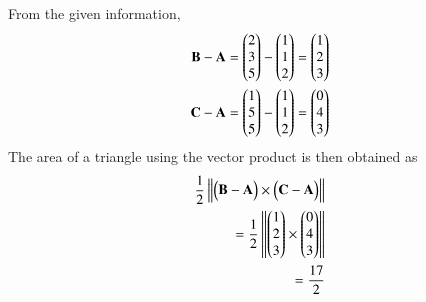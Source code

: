 From the given information, 
%
\begin{align}
\vec{B-A}&=\myvec{2\\3\\5}-\myvec{1\\1\\2} = \myvec{1\\2\\3}\\
\vec{C-A}&=\myvec{1\\5\\5}-\myvec{1\\1\\2}=\myvec{0\\4\\3}
\end{align}
The area of a triangle using the vector product is then obtained as
\begin{align}
        \frac{1}{2}\norm{\myvec{\vec{B-A}}\times\myvec{\vec{C-A}}} \\=\frac{1}{2}\norm{\myvec{1\\2\\3}\times \myvec{0\\4\\3}}\\=\frac{17}{2}
    \end{align}